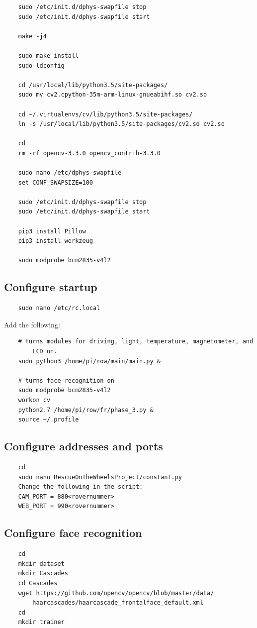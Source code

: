 \documentclass[12pt]{article}
\begin{document}
\begin{lstlisting}
	sudo /etc/init.d/dphys-swapfile stop
	sudo /etc/init.d/dphys-swapfile start
	
	make -j4
	
	sudo make install
	sudo ldconfig
	
	cd /usr/local/lib/python3.5/site-packages/
	sudo mv cv2.cpython-35m-arm-linux-gnueabihf.so cv2.so
	
	cd ~/.virtualenvs/cv/lib/python3.5/site-packages/
	ln -s /usr/local/lib/python3.5/site-packages/cv2.so cv2.so
	
	cd
	rm -rf opencv-3.3.0 opencv_contrib-3.3.0
	
	sudo nano /etc/dphys-swapfile
	set CONF_SWAPSIZE=100
	
	sudo /etc/init.d/dphys-swapfile stop
	sudo /etc/init.d/dphys-swapfile start
	
	pip3 install Pillow
	pip3 install werkzeug
	
	sudo modprobe bcm2835-v4l2

	\end{lstlisting}
	\subsection{Configure startup}
	\begin{lstlisting}
	sudo nano /etc/rc.local
	\end{lstlisting}
	Add the following:
	\begin{lstlisting}
	# turns modules for driving, light, temperature, magnetometer, and 
		LCD on.
	sudo python3 /home/pi/row/main/main.py &
	
	# turns face recognition on
	sudo modprobe bcm2835-v4l2
	workon cv
	python2.7 /home/pi/row/fr/phase_3.py &
	source ~/.profile
	\end{lstlisting}
	\subsection{Configure addresses and ports}
	\begin{lstlisting}
	cd
	sudo nano RescueOnTheWheelsProject/constant.py
	Change the following in the script:
	CAM_PORT = 880<rovernummer>
	WEB_PORT = 990<rovernummer>
	\end{lstlisting}
	\subsection{Configure face recognition}
	\begin{lstlisting}
	cd
	mkdir dataset
	mkdir Cascades
	cd Cascades
	wget https://github.com/opencv/opencv/blob/master/data/
		haarcascades/haarcascade_frontalface_default.xml
	cd
	mkdir trainer
	\end{lstlisting}
\end{document}
